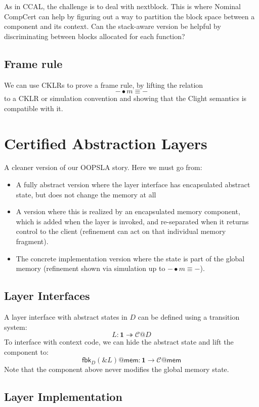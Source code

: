 \documentclass[acmsmall,screen,review,anonymous]{acmart}
\newcommand{\kw}[1]{\ensuremath{ \mathsf{#1} }}
\begin{document}
As in CCAL,
the challenge is to deal with nextblock.
This is where Nominal CompCert can help
by figuring out a way to partition the block space
between a component and its context.
Can the stack-aware version be helpful
by discriminating between blocks allocated
for each function?

\subsection{Frame rule}

We can use CKLRs to prove a frame rule,
by lifting the relation
\[
    {-} \bullet m \equiv {-}
\]
to a CKLR or simulation convention
and showing that the Clight semantics
is compatible with it.

\section{Certified Abstraction Layers}

A cleaner version of our OOPSLA story.
Here we must go from:
\begin{itemize}
  \item A fully abstract version where the layer interface
    has encapsulated abstract state,
    but does not change the memory at all
  \item A version where this is realized by an encapsulated
    memory component,
    which is added when the layer is invoked,
    and re-separated when it returns control to the client
    (refinement can act on that individual memory fragment).
  \item The concrete implementation version
    where the state is part of the global memory
    (refinement shown via
    simulation up to ${-} \bullet m \equiv {-}$).
\end{itemize}

\subsection{Layer Interfaces}

A layer interface with abstract states in $D$
can be defined using a transition system:
\[
  L : \mathbf{1} \twoheadrightarrow \mathcal{C}@D
\]
To interface with context code,
we can hide the abstract state and lift the component to:
\[
  \kw{fbk}_D(\&L)@\kw{mem} : \mathbf{1} \rightarrow \mathcal{C}@\kw{mem}
\]
Note that the component above never modifies the global memory state.

\subsection{Layer Implementation}
\end{document}
